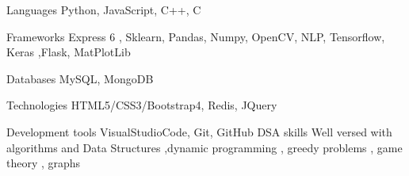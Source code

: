 
\begin{cvskills}
  \cvskill
    {Languages} %
    {Python, JavaScript, C++, C} %

  \cvskill
    {Frameworks} %
    {Express 6 , Sklearn, Pandas, Numpy, OpenCV, NLP, Tensorflow, Keras ,Flask, MatPlotLib} %
  
  \cvskill
    {Databases} %
    { MySQL, MongoDB} %
    
  \cvskill
    {Technologies} %
    {HTML5/CSS3/Bootstrap4, Redis, JQuery} %
    
  \cvskill
    {Development tools} %
    { VisualStudioCode, Git, GitHub} %
  \cvskill
    {DSA skills}
    {Well versed with algorithms and Data Structures ,dynamic programming , greedy problems , game theory , graphs  }
\end{cvskills}
